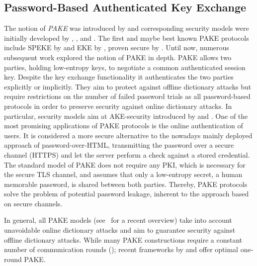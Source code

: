 \subsection{Password-Based Authenticated Key Exchange}
The notion of \emph{\ac{PAKE}} was introduced by \citet{bellovin92} and corresponding security models were initially developed by \citet{Bellare2000}, \citet{Boyko2000}, and \citet{Goldreich01}.
The first and maybe best known \ac{PAKE} protocols include SPEKE by \citet{Jablon96} and EKE by \citet{bellovin92}, proven secure by \citet{Bellare2000}.
Until now, numerous subsequent work explored the notion of \ac{PAKE} in depth.
\ac{PAKE} allows two parties, holding low-entropy keys, to negotiate a common authenticated session key.
Despite the key exchange functionality it authenticates the two parties explicitly or implicitly.
They aim to protect against offline dictionary attacks but require restrictions on the number of failed password trials as all password-based protocols in order to preserve security against online dictionary attacks.
In particular, security models aim at \ac{AKE}-security introduced by \citet{Bellare1993} and \citet{Bellare1995}.
One of the most promising applications of \ac{PAKE} protocols is the online authentication of users.
It is considered a more secure alternative to the nowadays mainly deployed approach of password-over-\ac{HTML}, \ie transmitting the password over a secure channel (\ac{HTTPS}) and let the server perform a check against a stored credential.
The standard model of \ac{PAKE} does not require any \ac{PKI}, which is necessary for the secure \ac{TLS} channel, and assumes that only a low-entropy secret, \ie a human memorable password, is shared between both parties.
Thereby, \ac{PAKE} protocols solve the problem of potential password leakage, inherent to the approach based on secure channels.

In general, all \ac{PAKE} models (see~\citet{Pointcheval2012} for a recent overview) take into account unavoidable online dictionary attacks and aim to guarantee security against offline dictionary attacks.
While many \ac{PAKE} constructions require a constant number of communication rounds (\citet{KatzOY01,Gennaro2003,Abdalla2005,Gennaro2008,Katz2009a,Katz2011,AbdallaBP14a}); recent frameworks by \citet{Katz2011} and \citet{Benhamouda2013} offer optimal one-round \ac{PAKE}.

